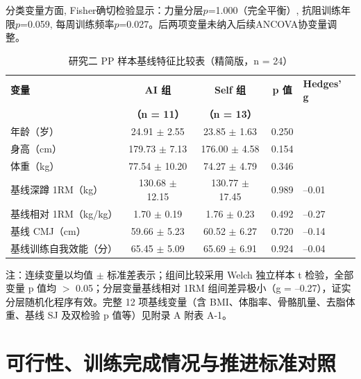 分类变量方面, Fisher确切检验显示：力量分层$p$=1.000（完全平衡）, 抗阻训练年限$p$=0.059, 每周训练频率$p$=0.027。后两项变量未纳入后续ANCOVA协变量调整。

\begin{table}[htbp]
\centering
\caption{研究二 PP 样本基线特征比较表（精简版，n = 24）}
\label{tab:baseline_simplified}
\begin{threeparttable}
\begin{tabular}{p{3.0cm}ccc>{\raggedleft\arraybackslash}p{1.5cm}}
\toprule
\textbf{变量} & \textbf{AI 组} & \textbf{Self 组} & \textbf{p 值} & \textbf{Hedges' g} \\
 & \textbf{（n = 11）} & \textbf{（n = 13）} & & \\
\midrule
年龄（岁）              & 24.91 $\pm$ 2.55     & 23.85 $\pm$ 1.63     & 0.250 & 0.49 \\
身高（cm）              & 179.73 $\pm$ 7.13    & 176.00 $\pm$ 4.58    & 0.154 & 0.61 \\
体重（kg）              & 77.54 $\pm$ 10.20    & 74.27 $\pm$ 4.79     & 0.346 & 0.41 \\
基线深蹲 1RM（kg）      & 130.68 $\pm$ 12.15   & 130.77 $\pm$ 17.45   & 0.989 & --0.01 \\
基线相对 1RM（kg/kg）   & 1.70 $\pm$ 0.19      & 1.76 $\pm$ 0.23      & 0.492 & --0.27 \\
基线 CMJ（cm）          & 59.66 $\pm$ 5.23     & 60.52 $\pm$ 6.27     & 0.720 & --0.14 \\
基线训练自我效能（分）  & 65.45 $\pm$ 5.09     & 65.69 $\pm$ 6.91     & 0.924 & --0.04 \\
\bottomrule
\end{tabular}
\begin{tablenotes}[flushleft]\footnotesize
\item 注：连续变量以均值 $\pm$ 标准差表示；组间比较采用 Welch 独立样本 t 检验，全部变量 p 值均 $>$ 0.05；分层变量基线相对 1RM 组间差异极小（g = --0.27），证实分层随机化程序有效。完整 12 项基线变量（含 BMI、体脂率、骨骼肌量、去脂体重、基线 SJ 及双检验 p 值等）见附录 A 附表 A-1。
\end{tablenotes}
\end{threeparttable}
\end{table}

\section{可行性、训练完成情况与推进标准对照}
\label{sec:feasibility}

